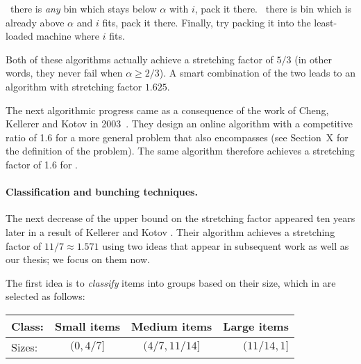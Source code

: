 \begin{algorithm}
\caption{}
\begin{algorithmic}[1]
\State \algorithmicif\ there is \emph{any} bin which stays below $\alpha$ with $i$, pack it there.
\State \algorithmicif\ there is bin which is already above $\alpha$ and $i$ fits, pack it there.
\State Finally, try packing it into the least-loaded machine where $i$ fits.
\EndFor 
\end{algorithmic}
\end{algorithm}

Both of these algorithms actually achieve a stretching factor of $5/3$
(in other words, they never fail when $\alpha \ge 2/3$). A smart
combination of the two leads to an algorithm with stretching factor
$1.625$.


The next algorithmic progress came as a consequence of the work of
Cheng, Kellerer and Kotov in 2003~\cite{cheng2003}. They design an
online algorithm with a competitive ratio of 1.6 for a more general
problem that also encompasses \binstretch (see Section~X for the
definition of the problem). The same algorithm therefore achieves a
stretching factor of 1.6 for \binstretch.

\paragraph{Classification and bunching techniques.} The next decrease
of the upper bound on the stretching factor appeared ten years later
in a result of Kellerer and Kotov \cite{kellerer2013}. Their algorithm
achieves a stretching factor of $11/7 \approx 1.571$ using two ideas
that appear in subsequent work as well as our thesis; we focus on them
now.


The first idea is to \emph{classify} items into groups based on their
size, which in \cite{kellerer2013} are selected as follows:

\begin{center}
  \begin{tabular}{ l | c | c | r }
    Class: & Small items & Medium items   & Large items \\ \hline
    Sizes: & $(0,4/7]$   & $(4/7, 11/14]$ & $(11/14,1]$ \\ 
  \end{tabular}
\end{center}

